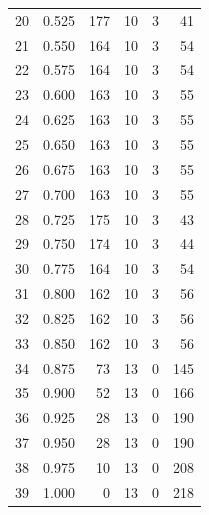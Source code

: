\documentclass[a4paper,twoside,12pt]{book}
\begin{document}
\begin{appendices}
\begin{table}
\begin{tabular}{lrrrrr}
		20 &  0.525 &       177 &        10 &               3 &              41 \\
		21 &  0.550 &       164 &        10 &               3 &              54 \\
		22 &  0.575 &       164 &        10 &               3 &              54 \\
		23 &  0.600 &       163 &        10 &               3 &              55 \\
		24 &  0.625 &       163 &        10 &               3 &              55 \\
		25 &  0.650 &       163 &        10 &               3 &              55 \\
		26 &  0.675 &       163 &        10 &               3 &              55 \\
		27 &  0.700 &       163 &        10 &               3 &              55 \\
		28 &  0.725 &       175 &        10 &               3 &              43 \\
		29 &  0.750 &       174 &        10 &               3 &              44 \\
		30 &  0.775 &       164 &        10 &               3 &              54 \\
		31 &  0.800 &       162 &        10 &               3 &              56 \\
		32 &  0.825 &       162 &        10 &               3 &              56 \\
		33 &  0.850 &       162 &        10 &               3 &              56 \\
		34 &  0.875 &        73 &        13 &               0 &             145 \\
		35 &  0.900 &        52 &        13 &               0 &             166 \\
		36 &  0.925 &        28 &        13 &               0 &             190 \\
		37 &  0.950 &        28 &        13 &               0 &             190 \\
		38 &  0.975 &        10 &        13 &               0 &             208 \\
		39 &  1.000 &         0 &        13 &               0 &             218 \\
		\bottomrule
	\end{tabular}
\end{table}


\end{appendices}
\end{document}
